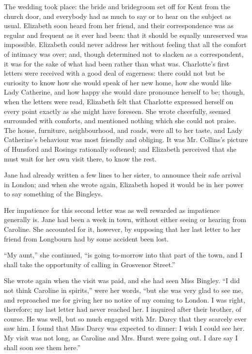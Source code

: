 The wedding took place: the bride and bridegroom set off for Kent from the church door, and everybody had as much to say or to hear on the subject as usual. Elizabeth soon heard from her friend, and their correspondence was as regular and frequent as it ever had been: that it should be equally unreserved was impossible. Elizabeth could never address her without feeling that all the comfort of intimacy was over; and, though determined not to slacken as a correspondent, it was for the sake of what had been rather than what was. Charlotte's first letters were received with a good deal of eagerness: there could not but be curiosity to know how she would speak of her new home, how she would like Lady Catherine, and how happy she would dare pronounce herself to be; though, when the letters were read, Elizabeth felt that Charlotte expressed herself on every point exactly as she might have foreseen. She wrote cheerfully, seemed surrounded with comforts, and mentioned nothing which she could not praise. The house, furniture, neighbourhood, and roads, were all to her taste, and Lady Catherine's behaviour was most friendly and obliging. It was Mr. Collins's picture of Hunsford and Rosings rationally softened; and Elizabeth perceived that she must wait for her own visit there, to know the rest.

Jane had already written a few lines to her sister, to announce their safe arrival in London; and when she wrote again, Elizabeth hoped it would be in her power to say something of the Bingleys.

Her impatience for this second letter was as well rewarded as impatience generally is. Jane had been a week in town, without either seeing or hearing from Caroline. She accounted for it, however, by supposing that her last letter to her friend from Longbourn had by some accident been lost.

``My aunt,'' she continued, ``is going to-morrow into that part of the town, and I shall take the opportunity of calling in Grosvenor Street.''

She wrote again when the visit was paid, and she had seen Miss Bingley. ``I did not think Caroline in spirits,'' were her words, ``but she was very glad to see me, and reproached me for giving her no notice of my coming to London. I was right, therefore; my last letter had never reached her. I inquired after their brother, of course. He was well, but so much engaged with Mr. Darcy that they scarcely ever saw him. I found that Miss Darcy was expected to dinner: I wish I could see her. My visit was not long, as Caroline and Mrs. Hurst were going out. I dare say I shall soon see them here.''

